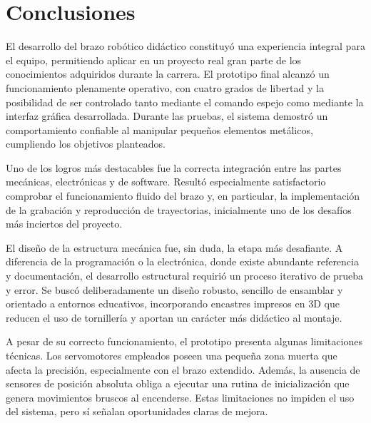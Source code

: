\section{Conclusiones}

El desarrollo del brazo robótico didáctico constituyó una experiencia integral para el equipo, permitiendo aplicar en un proyecto real gran parte de los conocimientos adquiridos durante la carrera. El prototipo final alcanzó un funcionamiento plenamente operativo, con cuatro grados de libertad y la posibilidad de ser controlado tanto mediante el comando espejo como mediante la interfaz gráfica desarrollada. Durante las pruebas, el sistema demostró un comportamiento confiable al manipular pequeños elementos metálicos, cumpliendo los objetivos planteados.

\vspace{1em}

Uno de los logros más destacables fue la correcta integración entre las partes mecánicas, electrónicas y de software. Resultó especialmente satisfactorio comprobar el funcionamiento fluido del brazo y, en particular, la implementación de la grabación y reproducción de trayectorias, inicialmente uno de los desafíos más inciertos del proyecto.

\vspace{1em}

El diseño de la estructura mecánica fue, sin duda, la etapa más desafiante. A diferencia de la programación o la electrónica, donde existe abundante referencia y documentación, el desarrollo estructural requirió un proceso iterativo de prueba y error. Se buscó deliberadamente un diseño robusto, sencillo de ensamblar y orientado a entornos educativos, incorporando encastres impresos en 3D que reducen el uso de tornillería y aportan un carácter más didáctico al montaje.

\vspace{1em}

A pesar de su correcto funcionamiento, el prototipo presenta algunas limitaciones técnicas. Los servomotores empleados poseen una pequeña zona muerta que afecta la precisión, especialmente con el brazo extendido. Además, la ausencia de sensores de posición absoluta obliga a ejecutar una rutina de inicialización que genera movimientos bruscos al encenderse. Estas limitaciones no impiden el uso del sistema, pero sí señalan oportunidades claras de mejora.

